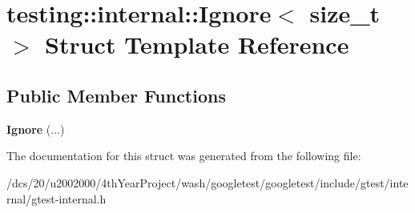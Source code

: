 \hypertarget{structtesting_1_1internal_1_1Ignore}{}\section{testing\+:\+:internal\+:\+:Ignore$<$ size\+\_\+t $>$ Struct Template Reference}
\label{structtesting_1_1internal_1_1Ignore}
\subsection*{Public Member Functions}
\begin{DoxyCompactItemize}
\item 
\mbox{\label{structtesting_1_1internal_1_1Ignore_ab39e8537a9b6432fc699ce72fa43650b}} 
{\bfseries Ignore} (...)
\end{DoxyCompactItemize}


The documentation for this struct was generated from the following file\+:\begin{DoxyCompactItemize}
\item 
/dcs/20/u2002000/4th\+Year\+Project/wash/googletest/googletest/include/gtest/internal/gtest-\/internal.\+h\end{DoxyCompactItemize}
